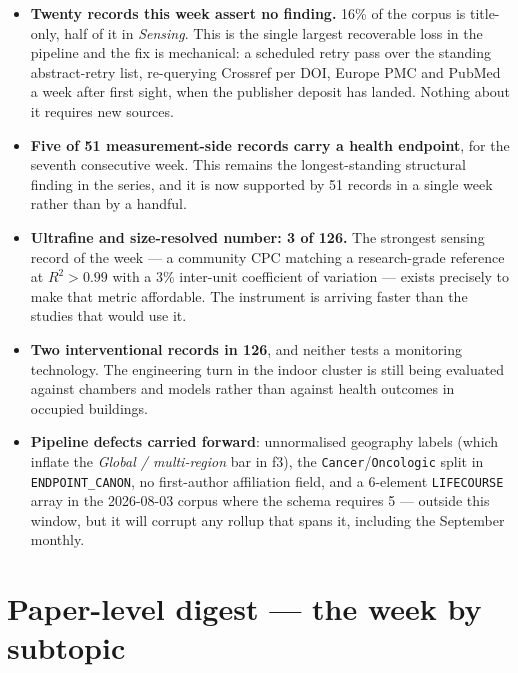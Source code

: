 \documentclass[10pt]{article}
\begin{document}
\footnotesize
\begin{itemize}
\item \textbf{Twenty records this week assert no finding.} 16\% of the corpus is
title-only, half of it in \textit{Sensing}. This is the single largest recoverable loss in
the pipeline and the fix is mechanical: a scheduled retry pass over the standing
abstract-retry list, re-querying Crossref per DOI, Europe PMC and PubMed a week after
first sight, when the publisher deposit has landed. Nothing about it requires new sources.

\item \textbf{Five of 51 measurement-side records carry a health endpoint}, for the
seventh consecutive week. This remains the longest-standing structural finding in the
series, and it is now supported by 51 records in a single week rather than by a handful.

\item \textbf{Ultrafine and size-resolved number: 3 of 126.} The strongest sensing record
of the week --- a community CPC matching a research-grade reference at $R^2>0.99$ with a
3\% inter-unit coefficient of variation --- exists precisely to make that metric
affordable. The instrument is arriving faster than the studies that would use it.

\item \textbf{Two interventional records in 126}, and neither tests a monitoring
technology. The engineering turn in the indoor cluster is still being evaluated against
chambers and models rather than against health outcomes in occupied buildings.

\item \textbf{Pipeline defects carried forward}: unnormalised geography labels (which
inflate the \textit{Global / multi-region} bar in f3), the \texttt{Cancer}/\texttt{Oncologic}
split in \texttt{ENDPOINT\_CANON}, no first-author affiliation field, and a 6-element
\texttt{LIFECOURSE} array in the 2026-08-03 corpus where the schema requires 5 --- outside
this window, but it will corrupt any rollup that spans it, including the September monthly.
\end{itemize}

\clearpage

\section*{\sffamily\bfseries\color{Deep}Paper-level digest --- the week by subtopic}
\vspace{-1.5mm}{\color{Teal}\rule{\linewidth}{1.1pt}}\vspace{1mm}
\end{document}

